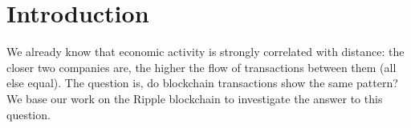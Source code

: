 \section{Introduction}


We already know that economic activity is strongly correlated with distance: the closer two companies are, the higher the flow of transactions between them (all else equal). The question is, do blockchain transactions show the same pattern? We base our work on the Ripple blockchain to investigate the answer to this question.